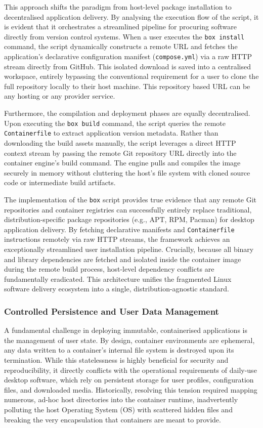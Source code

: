 \documentclass[journal,onecolumn]{IEEEtran}
\newcommand{\code}[1]{\texttt{#1}}
\begin{document}
This approach shifts the paradigm from host-level package installation to decentralised application delivery. By analysing the execution flow of the script, it is evident that it orchestrates a streamlined pipeline for procuring software directly from version control systems. When a user executes the \code{box install} command, the script dynamically constructs a remote URL and fetches the application's declarative configuration manifest (\code{compose.yml}) via a raw HTTP stream directly from GitHub. This isolated download is saved into a centralised workspace, entirely bypassing the conventional requirement for a user to clone the full repository locally to their host machine. This repository based URL can be any hosting or any provider service.

Furthermore, the compilation and deployment phases are equally decentralised. Upon executing the \code{box build} command, the script queries the remote \code{Containerfile} to extract application version metadata. Rather than downloading the build assets manually, the script leverages a direct HTTP context stream by passing the remote Git repository URL directly into the container engine's build command. The engine pulls and compiles the image securely in memory without cluttering the host's file system with cloned source code or intermediate build artifacts.

The implementation of the \code{box} script provides true evidence that any remote Git repositories and container registries can successfully entirely replace traditional, distribution-specific package repositories (e.g., APT, RPM, Pacman) for desktop application delivery. By fetching declarative manifests and \code{Containerfile} instructions remotely via raw HTTP streams, the framework achieves an exceptionally streamlined user installation pipeline. Crucially, because all binary and library dependencies are fetched and isolated inside the container image during the remote build process, host-level dependency conflicts are fundamentally eradicated. This architecture unifies the fragmented Linux software delivery ecosystem into a single, distribution-agnostic standard.

\subsubsection{Controlled Persistence and User Data Management}

A fundamental challenge in deploying immutable, containerised applications is the management of user state. By design, container environments are ephemeral, any data written to a container's internal file system is destroyed upon its termination. While this statelessness is highly beneficial for security and reproducibility, it directly conflicts with the operational requirements of daily-use desktop software, which rely on persistent storage for user profiles, configuration files, and downloaded media. Historically, resolving this tension required mapping numerous, ad-hoc host directories into the container runtime, inadvertently polluting the host Operating System (OS) with scattered hidden files and breaking the very encapsulation that containers are meant to provide.
\end{document}
